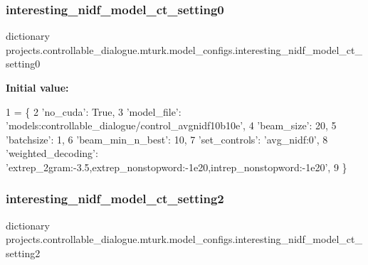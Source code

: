\subsubsection{\texorpdfstring{interesting\+\_\+nidf\+\_\+model\+\_\+ct\+\_\+setting0}{interesting\_nidf\_model\_ct\_setting0}}
{\footnotesize\ttfamily dictionary projects.\+controllable\+\_\+dialogue.\+mturk.\+model\+\_\+configs.\+interesting\+\_\+nidf\+\_\+model\+\_\+ct\+\_\+setting0}

{\bfseries Initial value\+:}
\begin{DoxyCode}
1 =  \{
2     \textcolor{stringliteral}{'no\_cuda'}: \textcolor{keyword}{True},
3     \textcolor{stringliteral}{'model\_file'}: \textcolor{stringliteral}{'models:controllable\_dialogue/control\_avgnidf10b10e'},
4     \textcolor{stringliteral}{'beam\_size'}: 20,
5     \textcolor{stringliteral}{'batchsize'}: 1,
6     \textcolor{stringliteral}{'beam\_min\_n\_best'}: 10,
7     \textcolor{stringliteral}{'set\_controls'}: \textcolor{stringliteral}{'avg\_nidf:0'},
8     \textcolor{stringliteral}{'weighted\_decoding'}: \textcolor{stringliteral}{'extrep\_2gram:-3.5,extrep\_nonstopword:-1e20,intrep\_nonstopword:-1e20'},
9 \}
\end{DoxyCode}
\mbox{\label{namespaceprojects_1_1controllable__dialogue_1_1mturk_1_1model__configs_a4bbad1170b884741dce2b3a56e7157ad}} 
\subsubsection{\texorpdfstring{interesting\+\_\+nidf\+\_\+model\+\_\+ct\+\_\+setting2}{interesting\_nidf\_model\_ct\_setting2}}
{\footnotesize\ttfamily dictionary projects.\+controllable\+\_\+dialogue.\+mturk.\+model\+\_\+configs.\+interesting\+\_\+nidf\+\_\+model\+\_\+ct\+\_\+setting2}

